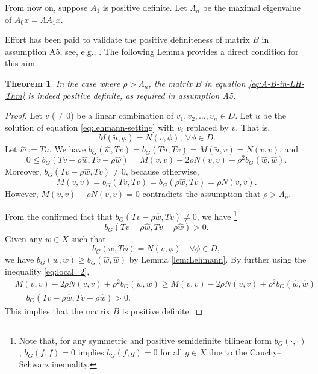\documentclass[a4,11pt]{article}
\numberwithin{equation}{section}
\newtheorem{lemma}{Theorem}[section]
\begin{document}
\bigskip

From now on, suppose $A_1$ is positive definite. 
Let $\Lambda_n$ be the maximal eigenvalue of $A_0x=\Lambda A_1 x$. 




Effort has been paid to validate the positive definiteness of matrix $B$ in assumption A5, see, e.g., 
\cite[Theorem 10.10, 10.21, 10.29]{nakao2019numerical_book}.
The following Lemma provides a direct condition for this aim.

{
\begin{lemma}
\label{lem:cond-for-positive-B}
In the case where $\rho > \Lambda_n$, the matrix $B$ in equation \eqref{eq:A-B-in-LH-Thm} is indeed positive definite, as required in assumption A5.
\end{lemma}
\begin{proof}
Let $v$ ($\neq 0$) be a linear combination of $v_1, v_2, \ldots, v_n \in D$. 
Let $\tilde{u}$ be the solution of equation \eqref{eq:lehmann-setting} with $v_i$ replaced by $v$. That is,
\begin{equation}
	\label{eq:local_B_positive_1}
M(\tilde{u}, \phi)=N(v,\phi), ~\forall \phi \in D.
\end{equation}
Let $\widehat{w} := T\tilde{u}$. We have $b_G(\widehat{w}, Tv)= b_G(T\tilde{u}, Tv)=
M(\tilde{u}, v)=N(v,v)$, and 
\[
0 \leq b_G(Tv - \rho \widehat{w}, Tv - \rho \widehat{w}) = M(v,v) - 2\rho N(v,v) + \rho^2 b_G(\widehat{w}, \widehat{w}).
\]
Moreover,  $b_G(Tv - \rho \widehat{w}, Tv)  \ne 0$, because otherwise, 
$$
M(v,v)=b_G(Tv, Tv)=b_G(\rho \widehat{w}, Tv)
=\rho N(v,v).
$$ 
However, $M(v,v) - \rho N(v,v) =0$  contradicts the assumption that $\rho > \Lambda_n$.

From the confirmed  fact that $b_G(Tv - \rho \widehat{w}, Tv)  \ne 0$, we have
\footnote{Note that, for any symmetric and positive semidefinite bilinear form $b_G(\cdot, \cdot)$,  $b_G(f,f)=0$ implies $b_G(f,g)=0$ for all $g\in X$ due to the Cauchy--Schwarz inequality.}
\begin{equation}
	\label{eq:local_2}
b_G(Tv - \rho \widehat{w}, Tv - \rho \widehat{w}) > 0.
\end{equation}
%
%
Given any $w\in X$   such that
\[
b_G(w, T\phi) = N(v, \phi) \quad \forall \phi \in D,
\]
we have 
 $b_G(w, w) \geq b_G(\widehat{w}, \widehat{w})$ by Lemma \ref{lem:Lehmann}. 
By further using the inequality \eqref{eq:local_2}, 
\begin{align*}
& M(v,v) - 2\rho N(v,v) + \rho^2 b_G(w, w) \ge M(v,v) - 2\rho N(v,v) + \rho^2 b_G(\widehat{w}, \widehat{w}) &\\
& = b_G(Tv - \rho \widehat{w}, Tv - \rho \widehat{w}) > 0.&	
\end{align*}
This implies that the matrix $B$ is positive definite.
\end{proof}


 }
 
\end{document}
